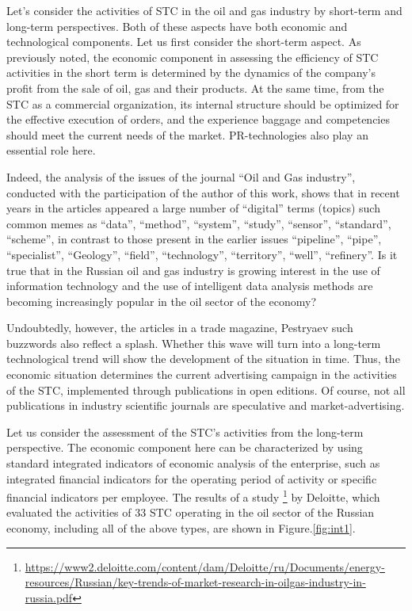 \documentclass[12pt]{report}
\theoremstyle{definition}
\begin{document}
Let's consider the activities of STC in the oil and gas industry by short-term and long-term perspectives. 
Both of these aspects have both economic and technological components. 
Let us first consider the short-term aspect.
As previously noted, the economic component in assessing the efficiency of STC activities in the short term is determined by the dynamics of the company's profit from the sale of oil, gas and their products.
At the same time, from the STC as a commercial organization, its internal structure should be optimized for the effective execution of orders, and the experience baggage and competencies should meet the current needs of the market.
PR-technologies also play an essential role here.

Indeed, the analysis of the issues of the journal ``Oil and Gas industry'', conducted with the participation of the author of this work, shows that in recent years in the articles appeared a large number of ``digital'' terms (topics) such common memes as ``data'', ``method'', ``system'', ``study'', ``sensor'', ``standard'', ``scheme'', in contrast to those present in the earlier issues  ``pipeline'', ``pipe'', ``specialist'', ``Geology'', ``field'', ``technology'', ``territory'', ``well'', ``refinery''.
Is it true that in the Russian oil and gas industry is growing interest in the use of information technology and the use of intelligent data analysis methods are becoming increasingly popular in the oil sector of the economy?

Undoubtedly, however, the articles in a trade magazine, Pestryaev such buzzwords also reflect a splash.
Whether this wave will turn into a long-term technological trend will show the development of the situation in time.
Thus, the economic situation determines the current advertising campaign in the activities of the STC, implemented through publications in open editions.
Of course, not all publications in industry scientific journals are speculative and market-advertising.

Let us consider the assessment of the STC's activities from the long-term perspective.
The economic component here can be characterized by using standard integrated indicators of economic analysis of the enterprise, such as integrated financial indicators for the operating period of activity or specific financial indicators per employee.
The results of a study \footnote{\url{https://www2.deloitte.com/content/dam/Deloitte/ru/Documents/energy-resources/Russian/key-trends-of-market-research-in-oilgas-industry-in-russia.pdf}}
by Deloitte, which evaluated the activities of 33 STC operating in the oil sector of the Russian economy, including all of the above types, are shown in Figure.\ref{fig:int1}.
\end{document}
